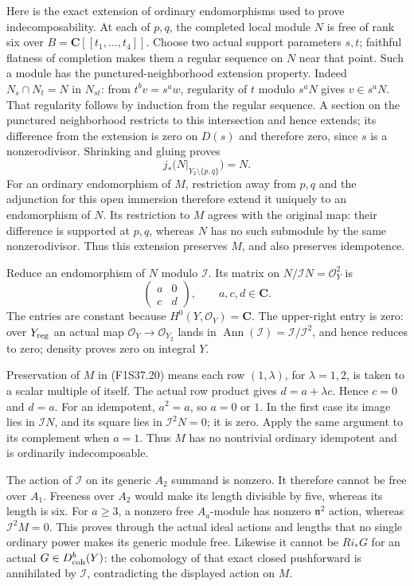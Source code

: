 Here is the exact extension of ordinary
endomorphisms used to prove indecomposability.
At each of $p,q$, the completed local
module $N$ is free of rank six over
$B=\mathbf C[[t_1,\ldots,t_4]]$.
Choose two actual support parameters
$s,t$; faithful flatness of completion
makes them a regular sequence on $N$
near that point. Such a module has the
punctured-neighborhood extension property.
Indeed $N_s\cap N_t=N$ in $N_{st}$:
from $t^b v=s^a w$, regularity of $t$
modulo $s^aN$ gives $v\in s^aN$.
That regularity follows by induction
from the regular sequence. A section
on the punctured neighborhood restricts
to this intersection and hence extends;
its difference from the extension is
zero on $D(s)$ and therefore zero,
since $s$ is a nonzerodivisor.
Shrinking and gluing proves
\[
             j_*\bigl(N|_{Y_2\setminus\{p,q\}}\bigr)=N.
 \tag{F1S37.21}
\]
For an ordinary endomorphism of $M$,
restriction away from $p,q$ and the
adjunction for this open immersion
therefore extend it uniquely to an
endomorphism of $N$. Its restriction
to $M$ agrees with the original map:
their difference is supported at
$p,q$, whereas $N$ has no such
submodule by the same nonzerodivisor.
Thus this extension preserves $M$,
and also preserves idempotence.

Reduce an endomorphism of $N$ modulo
$\mathcal I$. Its matrix on
$N/\mathcal I N=\mathcal O_Y^2$ is
\[
                         \begin{pmatrix}a&0\\c&d\end{pmatrix},
                                  \qquad a,c,d\in\mathbf C.
 \tag{F1S37.22}
\]
The entries are constant because
$H^0(Y,\mathcal O_Y)=\mathbf C$.
The upper-right entry is zero: over
$Y_{\rm reg}$ an actual map
$\mathcal O_Y\to\mathcal O_{Y_2}$
lands in $\operatorname{Ann}(\mathcal I)
=\mathcal I/\mathcal I^2$, and hence
reduces to zero; density proves zero
on integral $Y$.

Preservation of $M$ in (F1S37.20)
means each row $(1,\lambda)$, for
$\lambda=1,2$, is taken to a scalar
multiple of itself. The actual row
product gives $d=a+\lambda c$.
Hence $c=0$ and $d=a$.
For an idempotent, $a^2=a$, so
$a=0$ or $1$. In the first case
its image lies in $\mathcal I N$,
and its square lies in
$\mathcal I^2N=0$; it is zero.
Apply the same argument to its
complement when $a=1$.
Thus $M$ has no nontrivial ordinary
idempotent and is ordinarily indecomposable.

The action of $\mathcal I$ on its
generic $A_2$ summand is nonzero.
It therefore cannot be free over
$A_1$. Freeness over $A_2$ would
make its length divisible by five,
whereas its length is six. For
$a\ge3$, a nonzero free $A_a$-module
has nonzero $\mathfrak n^2$ action,
whereas $\mathcal I^2M=0$.
This proves through the actual ideal
actions and lengths that no single
ordinary power makes its generic
module free. Likewise it cannot be
$Ri_*G$ for an actual $G\in D^b_{\rm coh}(Y)$:
the cohomology of that exact closed
pushforward is annihilated by
$\mathcal I$, contradicting the
displayed action on $M$.

